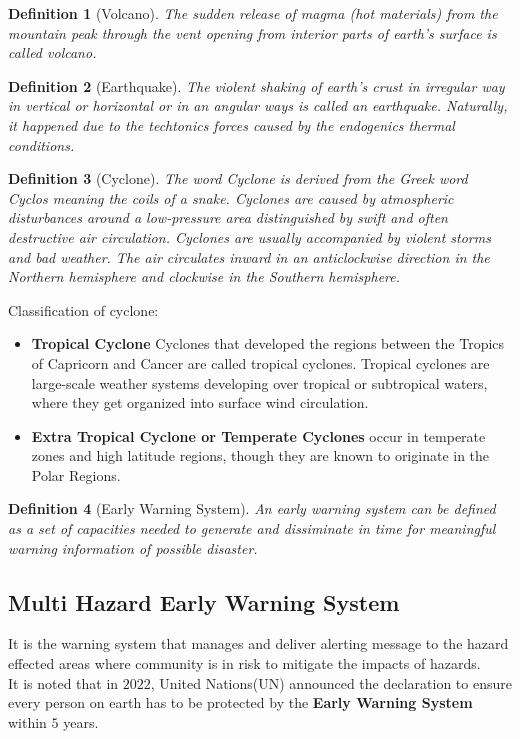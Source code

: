 \documentclass[12pt,a4paper]{article}
\newtheorem{defn}{Definition}
\begin{document}
\begin{defn}[Volcano]\normalfont
	The sudden release of magma (hot materials) from the mountain peak through the vent opening from interior parts of earth's surface is called \textit{volcano}.
\end{defn}

\begin{defn}[Earthquake]\normalfont
	The violent shaking of earth's crust in irregular way in vertical or horizontal or in an angular ways is called an earthquake. Naturally, it happened due to the techtonics forces caused by the endogenics thermal conditions.
\end{defn}

\begin{defn}[Cyclone]\normalfont
	The word \textit{Cyclone} is derived from the Greek word \textit{Cyclos} meaning the coils of a snake. Cyclones are caused by atmospheric disturbances around a low-pressure area distinguished by swift and often destructive air circulation. Cyclones are usually accompanied by violent storms and bad weather. The air circulates inward in an anticlockwise direction in the Northern hemisphere and clockwise in the Southern hemisphere.
\end{defn}
Classification of cyclone: 
\begin{itemize}
	\item \textbf{Tropical Cyclone} Cyclones that developed the regions between the Tropics of Capricorn and Cancer are called tropical cyclones. Tropical cyclones are large-scale weather systems developing over tropical or subtropical waters, where they get organized into surface wind circulation.
	\item \textbf{Extra Tropical Cyclone or Temperate Cyclones} occur in temperate zones and high latitude regions, though they are known to originate in the Polar Regions.
	
	
\end{itemize}

  \begin{defn} [Early Warning System]\normalfont
  	An early warning system can be defined as a set of capacities needed to generate and dissiminate in time for meaningful warning information of possible disaster.
  \end{defn}
\subsection*{Multi Hazard Early Warning System}
It is the warning system that manages and deliver alerting message to the hazard effected areas where community is in risk to mitigate the impacts of hazards. 
\\ 
It is noted that in $2022$, United Nations(UN) announced the declaration to ensure every person on earth has to be protected by the \textbf{Early Warning System} within $5$ years. 
\end{document}
